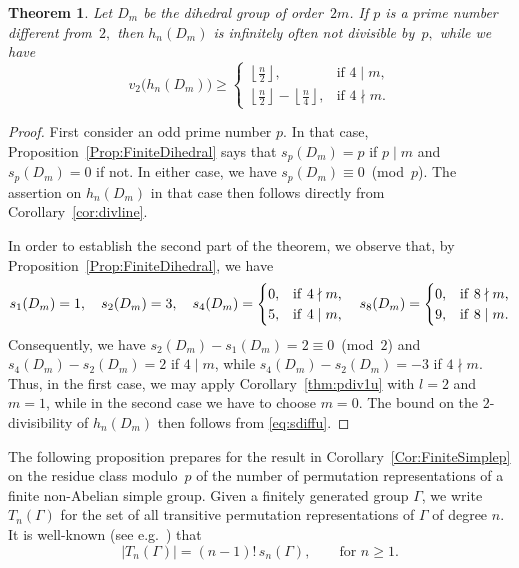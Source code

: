 \documentclass[12pt,reqno]{amsart}
\numberwithin{equation}{section}
\newtheorem{theorem}{Theorem}
\theoremstyle{remark}
\begin{document}
\begin{theorem} \label{cor:D}
Let $D_m$ be the dihedral group of order~$2m$. If $p$ is a prime
number different from~$2,$ then $h_n(D_m)$ is infinitely often not
divisible by~$p,$ while we have
\begin{equation} \label{eq:D}
v_2\big(h_n(D_m)\big)\ge 
\begin{cases} 
{\left\lfloor{\frac {n} {2}}\right\rfloor},&\text{if $4\mid m$,}\\[1mm]
{\left\lfloor{\frac {n} {2}}\right\rfloor}-{\left\lfloor{\frac {n} {4}}\right\rfloor},
&\text{if $4\nmid m$.}
\end{cases}
\end{equation}
\end{theorem}

\begin{proof}
First consider an odd prime number $p$. In that case,
Proposition~\ref{Prop:FiniteDihedral} says that $s_p(D_m)=p$
if $p\mid m$ and $s_p(D_m)=0$ if not. In either case, we have
$s_p(D_m)\equiv0$~(mod~$p$). The assertion on $h_n(D_m)$ in
that case then follows directly from Corollary~\ref{cor:divline}.

In order to establish the second part of the theorem, we observe that,
by Proposition~\ref{Prop:FiniteDihedral}, we have
\begin{equation*}
s_1(D_m)=1,\quad 
s_2(D_m)=3,\quad 
s_4(D_m)=\begin{cases} 
0,&\text{if\/ $4\nmid m$,}\\
5,&\text{if\/ $4\mid m$,}\\
\end{cases}\quad 
s_8(D_m)=\begin{cases} 
0,&\text{if\/ $8\nmid m$,}\\
9,&\text{if\/ $8\mid m$.}\\
\end{cases}
\end{equation*}
Consequently, we have $s_2(D_m)-s_1(D_m)=2\equiv0$~(mod~$2$) and
$s_4(D_m)-s_2(D_m)=2$ if $4\mid m$, while $s_4(D_m)-s_2(D_m)=-3$ 
if $4\nmid m$.
Thus, in the first case, we may apply 
Corollary~\ref{thm:pdiv1u} with $l=2$
and $m=1$, while in the second case we have to
choose $m=0$. The bound on the $2$-divisibility of $h_n(D_m)$ then
follows from \eqref{eq:sdiffu}.
\end{proof}

The following proposition prepares for the result in
Corollary~\ref{Cor:FiniteSimplep} on the residue class modulo~$p$
of the number of permutation representations of a finite non-Abelian
simple group.
Given a finitely generated group $\Gamma$,
we write $T_n(\Gamma)$ for the set of all transitive permutation
representations of $\Gamma$ of degree $n$. 
It is well-known (see e.g.\ \cite[Prop.~3]{KM}) that
\begin{equation}
\label{Eq:TransReps}
\vert T_n(\Gamma)\vert = (n-1)!\,s_n(\Gamma),\quad\quad 
\text{for } n\geq1.
\end{equation}
\end{document}
